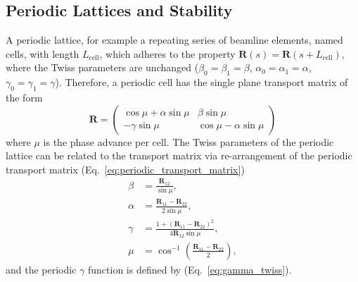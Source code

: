 \documentclass[../main.tex]{subfiles}
\begin{document}
\subsection{Periodic Lattices and Stability}

A periodic lattice, for example a repeating series of beamline elements, named cells, with length $L_{\mathrm{cell}}$, which adheres to the property $\boldsymbol{R}\left(s\right) = \boldsymbol{R}\left(s+L_{\mathrm{cell}}\right)$, where the Twiss parameters are unchanged ($\beta_{0}=\beta_{1}=\beta$, $\alpha_{0}=\alpha_{1}=\alpha$, $\gamma_{0}=\gamma_{1}=\gamma$). Therefore, a periodic cell has the single plane transport matrix of the form
\begin{equation}
\boldsymbol{R} =
\begin{pmatrix}
\cos\mu + \alpha\sin\mu & \beta\sin\mu \\
-\gamma\sin\mu & \cos\mu-\alpha\sin\mu
\end{pmatrix}
\label{eq:periodic_transport_matrix}    
\end{equation}
where $\mu$ is the phase advance per cell. The Twiss parameters of the periodic lattice can be related to the transport matrix via re-arrangement of the periodic transport matrix (Eq.~\ref{eq:periodic_transport_matrix})
\begin{align}
\beta &= \frac{\boldsymbol{R}_{12}}{\sin\mu}, 
\label{eq:periodic_beta_function} \\
\alpha & = \frac{\boldsymbol{R}_{11}-\boldsymbol{R}_{22}}{2\sin\mu},
\label{eq:periodic_alpha} \\
\gamma &= \frac{1+\left(\boldsymbol{R}_{11}-\boldsymbol{R}_{22}\right)^{2}}{4\boldsymbol{R}_{12}\sin\mu},
\label{eq:periodic_gamma} \\
\mu &= \cos^{-1}\left(\frac{\boldsymbol{R}_{11}-\boldsymbol{R}_{22}}{2}\right),
\label{eq:periodic_phase_advance}
\end{align}
and the periodic $\gamma$ function is defined by (Eq.~\ref{eq:gamma_twiss}).
\end{document}
